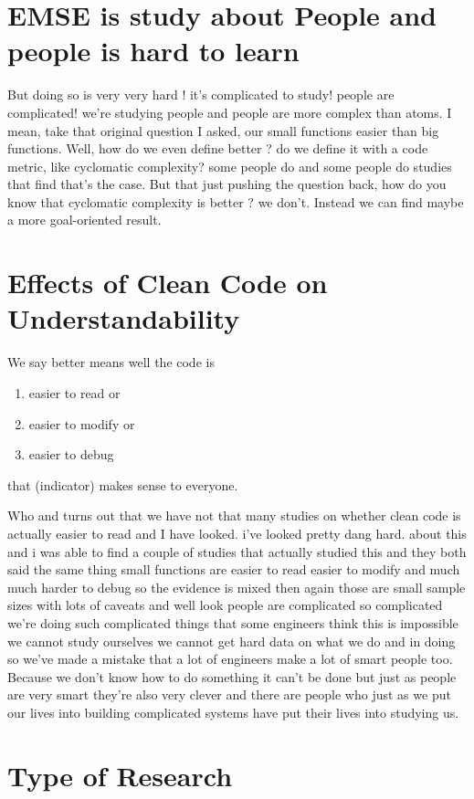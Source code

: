 \documentclass[conference, compsoc, twoside]{IEEEtran}
\begin{document}
\section{EMSE is study about People and people is hard to learn}
But doing so is very very hard ! 
it's complicated to study! people are complicated! 
we're studying people and people are more complex than atoms.
I mean, take that original question I asked, our small functions easier than big functions.
Well, how do we even define better ? do we define it with a code metric, like cyclomatic complexity? 
some people do and some people do studies that find that's the case. 
But that just pushing the question back, 
how do you know that cyclomatic complexity is better ? 
we don't. Instead we can find maybe a more goal-oriented result. 

\section{Effects of Clean Code on Understandability}
We say better means well the code is 
\begin{enumerate}
	\item easier to read or
	\item easier to modify or
	\item easier to debug

\end{enumerate}
that (indicator) makes sense to everyone.

Who and turns out that we have not that many studies on whether clean code is actually easier to read and I have looked. i've looked pretty dang hard.
about this and i was able to find a
couple of studies that actually studied
this and they both said the same thing
small functions are easier to read
easier to modify and much much harder to
debug so the evidence is mixed then
again those are small sample sizes with
lots of caveats and well look people are
complicated so complicated we're doing
such complicated things that some
engineers think this is impossible we
cannot study ourselves we cannot get
hard data on what we do and in doing so we've made a mistake that a lot of engineers make a lot of smart people too.
Because we don't know how to do something it can't be done but just as people are very smart they're also very
clever and there are people who just as we put our lives into building
complicated systems have put their lives into studying us.
\section{Type of Research} %
\label{sec:type_of_research}
\end{document}
